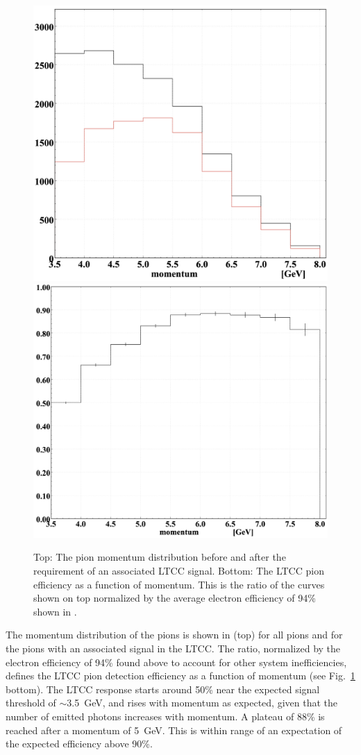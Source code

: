 \begin{figure}[H]
	\centering
	\includegraphics[width=0.98\columnwidth, height=0.7\columnwidth]{img/pionMomentum.png}
	\includegraphics[width=0.98\columnwidth, height=0.7\columnwidth]{img/pionEfficiency.png}
	\caption{Top: The pion momentum distribution before and after the requirement of an associated LTCC signal.
          Bottom: The LTCC pion efficiency as a function of momentum. This is the ratio of the curves shown on top
          normalized by the average electron efficiency of 94\% shown in .}
	\label{fig:pionMomentum}
\end{figure}

The momentum distribution of the pions is shown in  (top) for all pions and for the pions with an
associated signal in the LTCC. The ratio, normalized by the electron efficiency of 94\% found above to account for
other system inefficiencies, defines the LTCC pion detection efficiency as a function of momentum (see
Fig.~\ref{fig:pionMomentum} bottom). The LTCC response starts around 50\% near the expected signal threshold of
$\sim$3.5~GeV, and rises with momentum as expected, given that the number of emitted photons increases with
momentum. A plateau of 88\% is reached after a momentum of 5~GeV. This is within range of an expectation of
the expected efficiency above 90\%.

